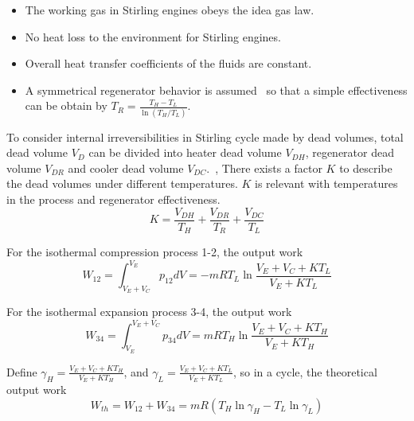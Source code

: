 \begin{itemize}
\item The working gas in Stirling engines obeys the idea gas law.
\item No heat loss to the environment for Stirling engines.
\item Overall heat transfer coefficients of the fluids are constant.
\item A symmetrical regenerator behavior is assumed~\cite{Formosa2010,Juhasz2010} so that a simple effectiveness can be obtain by $T_{R}=\frac{T_{H}-T_{L}}{\ln(T_{H}/T_{L})}$.
\end{itemize}

To consider internal irreversibilities in Stirling cycle made by dead volumes, total dead volume $V_D$ can be divided into heater dead volume $V_{DH}$, regenerator dead volume $V_{DR}$ and cooler dead volume $V_{DC}$.~\cite{Duan2014}, There exists a factor $K$ to describe the dead volumes under different temperatures. $K$ is relevant with temperatures in the process and regenerator effectiveness.
\begin{equation}
	K = \frac{V_{DH}}{T_H} + \frac{V_{DR}}{T_R} + \frac{V_{DC}}{T_L}
\end{equation}

For the isothermal compression process 1-2, the output work
\begin{equation}
	W_{12} = \int^{V_E}_{V_E+V_C}{p_{12}dV}=-mRT_L\ln{\frac{V_E+V_C+KT_L}{V_E+KT_L}}
\end{equation}

For the isothermal expansion process 3-4, the output work
\begin{equation}
	W_{34} = \int^{V_E+V_C}_{V_E}{p_{34}dV}=mRT_H\ln{\frac{V_E+V_C+KT_H}{V_E+KT_H}}
\end{equation}

Define $\gamma_H = \frac{V_E+V_C+KT_H}{V_E+KT_H}$, and $\gamma_L = \frac{V_E+V_C+KT_L}{V_E+KT_L}$, so in a cycle, the theoretical output work
\begin{equation}
	W_{th} = W_{12} + W_{34} = mR(T_H\ln\gamma_H - T_L\ln\gamma_L)
\end{equation}

